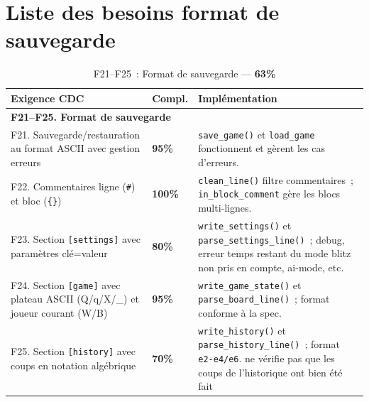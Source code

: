\documentclass[a4paper]{article}
\begin{document}
 
\section{Liste des besoins format de sauvegarde}
\label{ann:besoins-save}
 
 
\begin{table}[H]
\centering
\renewcommand{\arraystretch}{1.4}
\begin{tabular}{|p{6cm}|p{1.5cm}|p{8cm}|}
\hline
\textbf{Exigence CDC} & \textbf{Compl.} & \textbf{Implémentation} \\
\hline
\multicolumn{3}{|l|}{\textbf{F21--F25. Format de sauvegarde}} \\
\hline
F21. Sauvegarde/restauration au format ASCII avec gestion erreurs
& \textbf{95\%}
& \texttt{save\_game()} et \texttt{load\_game} fonctionnent et gèrent les cas d'erreurs. \\
\hline
F22. Commentaires ligne (\texttt{\#}) et bloc (\texttt{\{\}})
& \textbf{100\%}
& \texttt{clean\_line()} filtre commentaires~; \texttt{in\_block\_comment} gère les blocs multi-lignes. \\
\hline
F23. Section \texttt{[settings]} avec paramètres clé=valeur
& \textbf{80\%}
& \texttt{write\_settings()} et \texttt{parse\_settings\_line()}~; debug, erreur temps restant du mode blitz non pris en compte, ai-mode, etc. \\
\hline
F24. Section \texttt{[game]} avec plateau ASCII (Q/q/X/\_) et joueur courant (W/B)
& \textbf{95\%}
& \texttt{write\_game\_state()} et \texttt{parse\_board\_line()}~; format conforme à la spec. \\
\hline
F25. Section \texttt{[history]} avec coups en notation algébrique
& \textbf{70\%}
& \texttt{write\_history()} et \texttt{parse\_history\_line()}~; format \texttt{e2-e4/e6}. ne vérifie pas que les coups de l'historique ont bien été fait \\
\hline
\end{tabular}
\caption{F21--F25~: Format de sauvegarde --- \textbf{63\%}}
\label{tab:f21-f25}
\end{table}
 
\end{document}
